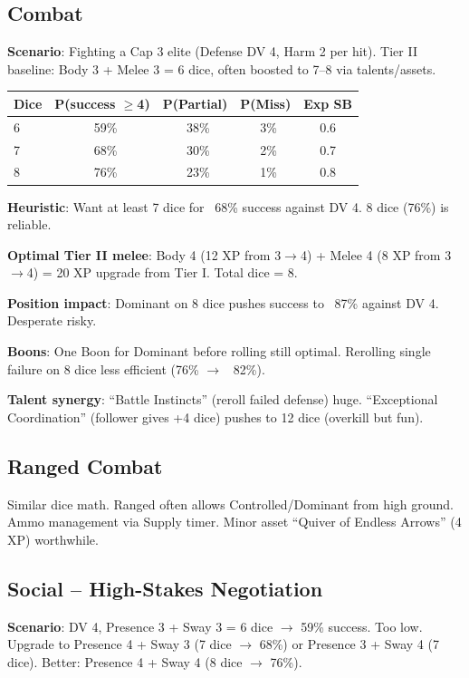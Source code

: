 \documentclass[11pt]{article}
\begin{document}
\subsection{Combat}
\textbf{Scenario}: Fighting a Cap 3 elite (Defense DV 4, Harm 2 per hit). Tier II baseline: Body 3 + Melee 3 = 6 dice, often boosted to 7--8 via talents/assets.

\begin{table}[h]
\centering
\begin{tabular}{lcccc}
\toprule
\textbf{Dice} & \textbf{P(success $\geq$4)} & \textbf{P(Partial)} & \textbf{P(Miss)} & \textbf{Exp SB} \\
\midrule
6 & ~59\% & ~38\% & ~3\% & 0.6 \\
7 & ~68\% & ~30\% & ~2\% & 0.7 \\
8 & ~76\% & ~23\% & ~1\% & 0.8 \\
\bottomrule
\end{tabular}
\end{table}

\textbf{Heuristic}: Want at least 7 dice for ~68\% success against DV 4. 8 dice (76\%) is reliable.

\textbf{Optimal Tier II melee}: Body 4 (12 XP from 3$\rightarrow$4) + Melee 4 (8 XP from 3$\rightarrow$4) = 20 XP upgrade from Tier I. Total dice = 8.

\textbf{Position impact}: Dominant on 8 dice pushes success to ~87\% against DV 4. Desperate risky.

\textbf{Boons}: One Boon for Dominant before rolling still optimal. Rerolling single failure on 8 dice less efficient (76\% $\rightarrow$ ~82\%).

\textbf{Talent synergy}: ``Battle Instincts'' (reroll failed defense) huge. ``Exceptional Coordination'' (follower gives +4 dice) pushes to 12 dice (overkill but fun).

\subsection{Ranged Combat}
Similar dice math. Ranged often allows Controlled/Dominant from high ground. Ammo management via Supply timer. Minor asset ``Quiver of Endless Arrows'' (4 XP) worthwhile.

\subsection{Social -- High-Stakes Negotiation}
\textbf{Scenario}: DV 4, Presence 3 + Sway 3 = 6 dice $\rightarrow$ 59\% success. Too low. Upgrade to Presence 4 + Sway 3 (7 dice $\rightarrow$ 68\%) or Presence 3 + Sway 4 (7 dice). Better: Presence 4 + Sway 4 (8 dice $\rightarrow$ 76\%).
\end{document}
